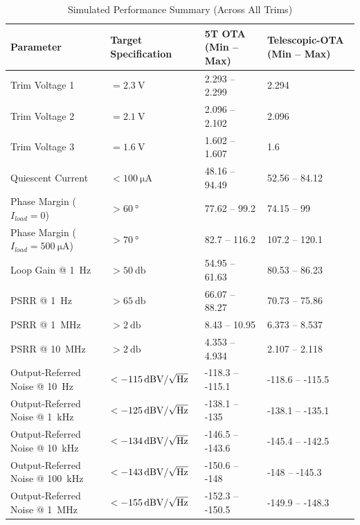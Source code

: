 \documentclass[journal]{IEEEtran}
\begin{document}
\begin{table}[t]
    \renewcommand{\arraystretch}{1.2}
    \caption{Simulated Performance Summary (Across All Trims)}
    \label{tab:performance_summary}
    \centering
    \begin{tabularx}{\textwidth}{@{} X X @{} X X @{}}
        \toprule
        \textbf{Parameter} & \textbf{Target Specification} & \textbf{5T OTA (Min -- Max)} & \textbf{Telescopic-OTA (Min -- Max)}\\
        \midrule
        Trim Voltage 1 & $= \qty{2.3}{\volt}$ & 2.293 -- 2.299 & 2.294 \\
        Trim Voltage 2 & $= \qty{2.1}{\volt}$ & 2.096 -- 2.102 & 2.096 \\
        Trim Voltage 3 & $= \qty{1.6}{\volt}$ & 1.602 -- 1.607 & 1.6 \\
        Quiescent Current & $< \qty{100}{\micro\ampere}$ & 48.16 -- 94.49 & 52.56 -- 84.12 \\
        \midrule
        Phase Margin ($I_{load} = 0$) & $> \qty{60}{\degree}$ & 77.62 -- 99.2 & 74.15 -- 99 \\
        Phase Margin ($I_{load} = \qty{500}{\micro\ampere}$) & $> \qty{70}{\degree}$ & 82.7 -- 116.2 & 107.2 -- 120.1 \\
        \midrule
        Loop Gain @ \qty{1}{\hertz} & $> \qty{50}{\decibel}$ & 54.95 -- 61.63 & 80.53 -- 86.23 \\
        PSRR @ \qty{1}{\hertz} & $>\qty{65}{\decibel}$ & 66.07 -- 88.27 & 70.73 -- 75.86 \\
        PSRR @ \qty{1}{\mega\hertz} & $>\qty{2}{\decibel}$ & 8.43 -- 10.95 & 6.373 -- 8.537 \\
        PSRR @ \qty{10}{\mega\hertz} & $>\qty{2}{\decibel}$ & 4.353 -- 4.934 & 2.107 -- 2.118 \\
        \midrule
        Output-Referred Noise @ \qty{10}{\hertz} & $<-\qty{115}{\decibel\volt\slash\sqrt{\Hz}}$ & -118.3 -- -115.1 & -118.6 -- -115.5 \\
        Output-Referred Noise @ \qty{1}{\kilo\hertz} & $<-\qty{125}{\decibel\volt\slash\sqrt{\Hz}}$ & -138.1 -- -135 & -138.1 -- -135.1 \\
        Output-Referred Noise @ \qty{10}{\kilo\hertz} & $<-\qty{134}{\decibel\volt\slash\sqrt{\Hz}}$ & -146.5 -- -143.6 & -145.4 -- -142.5 \\
        Output-Referred Noise @ \qty{100}{\kilo\hertz} & $<-\qty{143}{\decibel\volt\slash\sqrt{\Hz}}$ & -150.6 -- -148 & -148 -- -145.3 \\
        Output-Referred Noise @ \qty{1}{\mega\hertz} & $<-\qty{155}{\decibel\volt\slash\sqrt{\Hz}}$ & -152.3 -- -150.5 & -149.9 -- -148.3 \\
        \bottomrule
    \end{tabularx}
\end{table}
\end{document}
